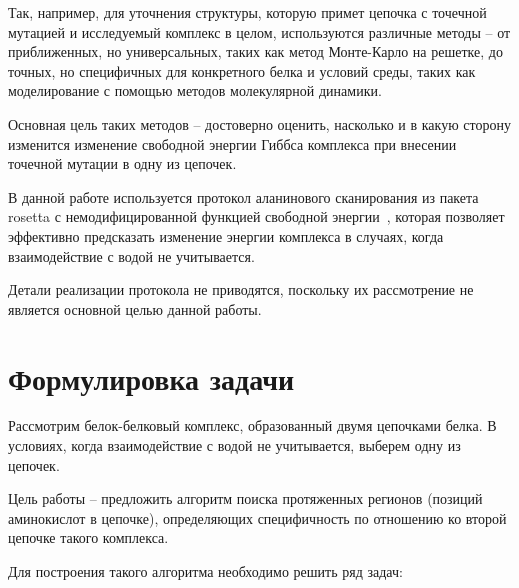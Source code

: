 Так, например, для уточнения структуры, которую примет цепочка с точечной мутацией и исследуемый комплекс в целом, используются различные методы -- от приближенных, но универсальных, таких как метод Монте-Карло на решетке, до точных, но специфичных для конкретного белка и условий среды, таких как моделирование с помощью методов молекулярной динамики.

Основная цель таких методов -- достоверно оценить, насколько и в какую сторону изменится изменение свободной энергии Гиббса \ddG комплекса при внесении точечной мутации в одну из цепочек.

В данной работе используется протокол аланинового сканирования из пакета rosetta с немодифицированной функцией свободной энергии~\cite{kortemme2002}, которая позволяет эффективно предсказать изменение энергии комплекса в случаях, когда  взаимодействие с водой не учитывается.

Детали реализации протокола не приводятся, поскольку их рассмотрение не является основной целью данной работы.




\section{Формулировка задачи}
Рассмотрим белок-белковый комплекс, образованный двумя цепочками белка. В условиях, когда взаимодействие с водой не учитывается, выберем одну из цепочек. 

Цель работы -- предложить алгоритм поиска протяженных регионов (позиций аминокислот в цепочке), определяющих специфичность по отношению ко второй цепочке такого комплекса.

Для построения такого алгоритма необходимо решить ряд задач:

